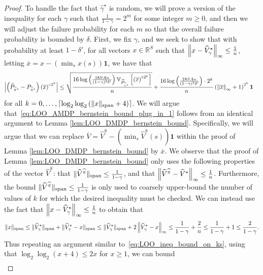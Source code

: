 \documentclass{article}
\theoremstyle{plain}
\theoremstyle{plain}
\theoremstyle{remark}
\theoremstyle{plain}
\theoremstyle{plain}
\newcommand{\R}{\mathbb{R}}
\newcommand{\Var}{\mathbb{V}}
\newcommand{\Phat}{\widehat{P}}
\newcommand{\Vhat}{\widehat{V}}
\newcommand{\pihstar}{\widehat{\pi}^\star}
\newcommand{\one}{\mathbf{1}}
\newcommand{\pihat}{\widehat{\pi}}
\newcommand{\Vc}{\overline{V}}
\newcommand{\empbod}{\widehat{\gamma}^\star}
\newcommand{\ox}{\overline{x}}
\begin{document}
\begin{proof}
    To handle the fact that $\empbod$ is random, we will prove a version of the inequality for each $\gamma$ such that $\frac{1}{1-\gamma} = 2^m$ for some integer $m \geq 0$, and then we will adjust the failure probability for each $m$ so that the overall failure probability is bounded by $\delta$. First, we fix $\gamma$, and we seek to show that with probability at least $1 - \delta'$, for all vectors $x \in \R^S$ such that $\infnorm{x - \Vhat_\gamma^\star} \leq \frac{1}{n}$, letting $\ox = x - (\min_s x(s))\one$, we have that
    \begin{align}
        \left| \left(\Phat_{\pihstar} - P_{\pihstar}\right) \left( \ox \right)^{\circ 2^k} \right|
    &\leq \sqrt{\frac{16 \log \left(\frac{18 SA n}{(1-\gamma)^2\delta'} \right)   \Var_{\Phat_{\pihstar}} \left[ \left(\ox \right)^{\circ 2^k}  \right]    }{n }} + \frac{ 16 \log \left(\frac{18 SA n}{(1-\gamma)^2\delta'} \right) \cdot 2^k }{n}  \left( \infnorm{\ox} + 1\right)^{2^k}   \one \label{eq:LOO_AMDP_bernstein_bound_plug_in_1}
    \end{align}
    for all $k = 0, \dots, \left\lceil\log_2 \log_2 \left( \Vert x\Vert _{\textnormal{span}} + 4\right) \right\rceil$. 
    We will argue that~\eqref{eq:LOO_AMDP_bernstein_bound_plug_in_1} follows from an identical argument to Lemma \ref{lem:LOO_DMDP_bernstein_bound}. Specifically, we will argue that we can replace $\Vc =\Vhat^{\pihat} - \left( \min_s \Vhat^{\pihat}(s) \right) \one$ within the proof of Lemma \ref{lem:LOO_DMDP_bernstein_bound} by $\ox$.
    We observe that the proof of Lemma \ref{lem:LOO_DMDP_bernstein_bound} only uses the following properties of the vector $\Vhat^{\pihat}$: that $\spannorm{\Vhat^{\pihat}} \leq \frac{1}{1-\gamma}$, and that $\infnorm{\Vhat^{\pihat} - \Vhat^{\star}} \leq \frac{1}{n}$. Furthermore, the bound $\spannorm{\Vhat^{\pihat}} \leq \frac{1}{1-\gamma}$ is only used to coarsely upper-bound the number of values of $k$ for which the desired inequality must be checked. We can instead use the fact that $\infnorm{x - \Vhat_\gamma^\star} \leq \frac{1}{n}$ to obtain that
    \[
    \spannorm{x} \leq \spannorm{\Vhat_\gamma^\star} + \spannorm{\Vhat_\gamma^\star - x} \leq \spannorm{\Vhat_\gamma^\star} + 2\infnorm{\Vhat_\gamma^\star - x} \leq \frac{1}{1-\gamma} + \frac{2}{n} \leq \frac{1}{1-\gamma} + 1 \leq \frac{2}{1-\gamma}.
    \]
    Thus repeating an argument similar to~\eqref{eq:LOO_ineq_bound_on_ks}, using that $\log_2 \log_2 (x+4) \leq 2x$ for $x \geq 1$, we can bound
    \begin{align*}

\end{align*}
\end{proof}
\end{document}
